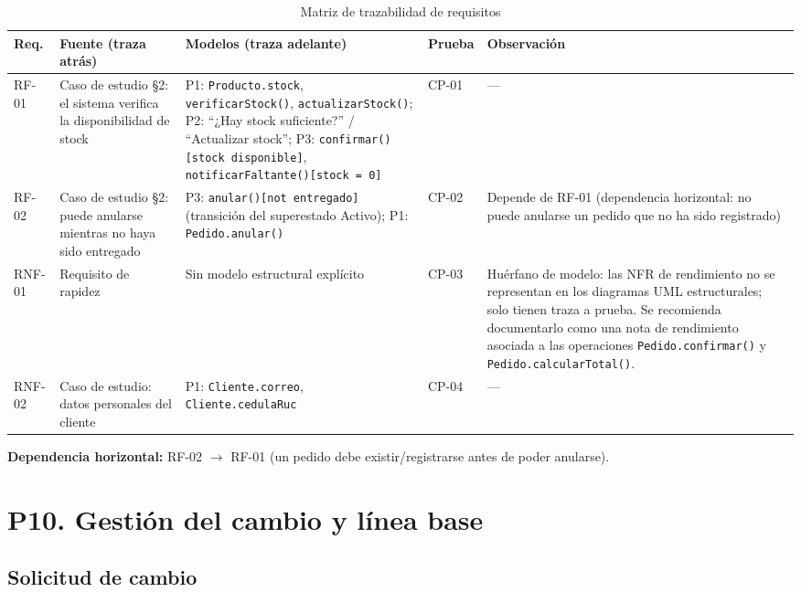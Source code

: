 \documentclass[12pt,a4paper]{article}
\begin{document}
    \begin{table}[H]
    \centering
    \small
    \begin{tabular}{@{}p{1.5cm}p{3.5cm}p{4.5cm}p{1.5cm}p{3.5cm}@{}}
    \toprule
    \textbf{Req.} & \textbf{Fuente (traza atrás)} & \textbf{Modelos (traza adelante)} & \textbf{Prueba} & \textbf{Observación} \\
    \midrule
    RF-01 & Caso de estudio \S2: el sistema verifica la disponibilidad de stock & P1: \texttt{Producto.stock}, \texttt{verificarStock()}, \texttt{actualizarStock()}; P2: ``¿Hay stock suficiente?'' / ``Actualizar stock''; P3: \texttt{confirmar()[stock disponible]}, \texttt{notificarFaltante()[stock = 0]} & CP-01 & --- \\
    \addlinespace
    RF-02 & Caso de estudio \S2: puede anularse mientras no haya sido entregado & P3: \texttt{anular()[not entregado]} (transición del superestado Activo); P1: \texttt{Pedido.anular()} & CP-02 & Depende de RF-01 (dependencia horizontal: no puede anularse un pedido que no ha sido registrado) \\
    \addlinespace
    RNF-01 & Requisito de rapidez & Sin modelo estructural explícito & CP-03 & Huérfano de modelo: las NFR de rendimiento no se representan en los diagramas UML estructurales; solo tienen traza a prueba. Se recomienda documentarlo como una nota de rendimiento asociada a las operaciones \texttt{Pedido.confirmar()} y \texttt{Pedido.calcularTotal()}. \\
    \addlinespace
    RNF-02 & Caso de estudio: datos personales del cliente & P1: \texttt{Cliente.correo}, \texttt{Cliente.cedulaRuc} & CP-04 & --- \\
    \bottomrule
    \end{tabular}
    \caption{Matriz de trazabilidad de requisitos}
    \end{table}
    
    \textbf{Dependencia horizontal:} RF-02 $\rightarrow$ RF-01 (un pedido debe existir/registrarse antes de poder anularse).
    
    \section{P10. Gestión del cambio y línea base}
    
    \subsection*{Solicitud de cambio}
    
\end{document}
